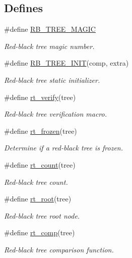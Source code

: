 \subsection*{Defines}
\begin{CompactItemize}
\item 
\#define \hyperlink{group__dbprim__rbtree_ga17}{RB\_\-TREE\_\-MAGIC}
\begin{CompactList}\small\item\em Red-black tree magic number. \item\end{CompactList}\item 
\#define \hyperlink{group__dbprim__rbtree_ga18}{RB\_\-TREE\_\-INIT}(comp, extra)
\begin{CompactList}\small\item\em Red-black tree static initializer. \item\end{CompactList}\item 
\#define \hyperlink{group__dbprim__rbtree_ga19}{rt\_\-verify}(tree)
\begin{CompactList}\small\item\em Red-black tree verification macro. \item\end{CompactList}\item 
\#define \hyperlink{group__dbprim__rbtree_ga20}{rt\_\-frozen}(tree)
\begin{CompactList}\small\item\em Determine if a red-black tree is frozen. \item\end{CompactList}\item 
\#define \hyperlink{group__dbprim__rbtree_ga21}{rt\_\-count}(tree)
\begin{CompactList}\small\item\em Red-black tree count. \item\end{CompactList}\item 
\#define \hyperlink{group__dbprim__rbtree_ga22}{rt\_\-root}(tree)
\begin{CompactList}\small\item\em Red-black tree root node. \item\end{CompactList}\item 
\#define \hyperlink{group__dbprim__rbtree_ga23}{rt\_\-comp}(tree)
\begin{CompactList}\small\item\em Red-black tree comparison function. \item\end{CompactList}\item 

\end{CompactItemize}

